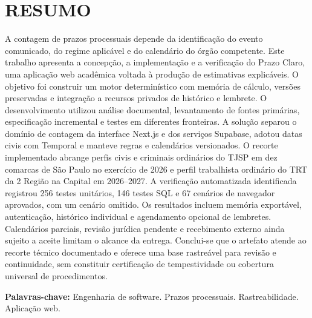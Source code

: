 \documentclass[12pt,a4paper,oneside]{report}
\begin{document}
\chapter*{RESUMO}\thispagestyle{empty}
\begin{singlespace}\noindent A contagem de prazos processuais depende da identificação do evento comunicado, do regime aplicável e do calendário do órgão competente. Este trabalho apresenta a concepção, a implementação e a verificação do Prazo Claro, uma aplicação web acadêmica voltada à produção de estimativas explicáveis. O objetivo foi construir um motor determinístico com memória de cálculo, versões preservadas e integração a recursos privados de histórico e lembrete. O desenvolvimento utilizou análise documental, levantamento de fontes primárias, especificação incremental e testes em diferentes fronteiras. A solução separou o domínio de contagem da interface Next.js e dos serviços Supabase, adotou datas civis com Temporal e manteve regras e calendários versionados. O recorte implementado abrange perfis civis e criminais ordinários do TJSP em dez comarcas de São Paulo no exercício de 2026 e perfil trabalhista ordinário do TRT da 2\textordfeminine{} Região na Capital em 2026--2027. A verificação automatizada identificada registrou 256 testes unitários, 146 testes SQL e 67 cenários de navegador aprovados, com um cenário omitido. Os resultados incluem memória exportável, autenticação, histórico individual e agendamento opcional de lembretes. Calendários parciais, revisão jurídica pendente e recebimento externo ainda sujeito a aceite limitam o alcance da entrega. Conclui-se que o artefato atende ao recorte técnico documentado e oferece uma base rastreável para revisão e continuidade, sem constituir certificação de tempestividade ou cobertura universal de procedimentos.\par\medskip
\noindent\textbf{Palavras-chave:} Engenharia de software. Prazos processuais. Rastreabilidade. Aplicação web.
\end{singlespace}
\clearpage
\end{document}
